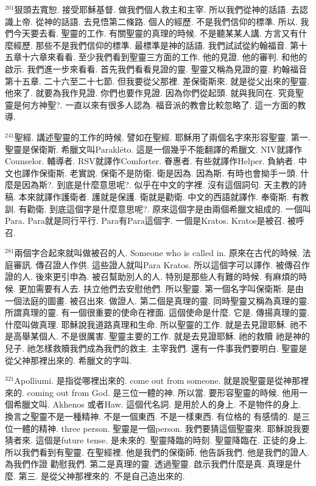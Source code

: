 \documentclass{book}
\begin{document}
$^{201}$狠頭去寬恕.
接受耶穌基督.
做我們個人救主和主宰.
所以我們從神的話語.
去認識上帝.
從神的話語.
去見悟第二條路.
個人的經歷.
不是我們信仰的標準.
所以.
我們今天要去看.
聖靈的工作.
有關聖靈的真理的時候.
不是聽某某人講.
方言又有什麼經歷.
那些不是我們信仰的標準.
最標準是神的話語.
我們試試從約翰福音.
第十五章十六章來看看.
至少我們看到聖靈三方面的工作.
他的見證.
他的審判.
和他的啟示.
我們進一步來看看.
首先我們看看見證的靈.
聖靈又稱為見證的靈.
約翰福音第十五章.
二十六至二十七節.
但我要從父那裡.
差保衛斯來.
就是從父出來的聖靈.
他來了.
就要為我作見證.
你們也要作見證.
因為你們從起頭.
就與我同在.
究竟聖靈是何方神聖?.
一直以來有很多人認為.
福音派的教會比較忽略了.
這一方面的教導.

$^{241}$聖經.
講述聖靈的工作的時候.
譬如在聖經.
耶穌用了兩個名字來形容聖靈.
第一.
聖靈是保衛斯.
希臘文叫Paraklēto.
這是一個幾乎不能翻譯的希臘文.
NIV就譯作Counselor.
輔導者.
RSV就譯作Comforter.
眷惠者.
有些就譯作Helper.
負納者.
中文也譯作保衛斯.
老實說.
保衛不是防衛.
衛是因為.
因為斯.
有時也會拗手一頭.
什麼是因為斯?.
到底是什麼意思呢?.
似乎在中文的字裡.
沒有這個詞句.
天主教的詩稿.
本來就譯作護衛者.
護就是保護.
衛就是勸衛.
中文的西語就譯作.
奉衛斯.
有教訓.
有勸衛.
到底這個字是什麼意思呢?.
原來這個字是由兩個希臘文組成的.
一個叫Para.
Para就是同行平行.
Para有Para這個字.
一個是Kratos.
Kratos是被召.
被呼召.

$^{281}$兩個字合起來就叫做被召的人.
Someone who is called in.
原來在古代的時候.
法庭審訊.
傳召證人作供.
這些證人就叫Para Kratos.
所以這個字可以譯作.
被傳召作證的人.
後來更引申為.
被召幫助別人的人.
特別是那些人有難的時候.
有麻煩的時候.
更加需要有人去.
扶立他們去安慰他們.
所以聖靈.
第一個名字叫保衛斯.
是由一個法庭的圖畫.
被召出來.
做證人.
第二個是真理的靈.
同時聖靈又稱為真理的靈.
所謂真理的靈.
有一個很重要的使命在裡面.
這個使命是什麼.
它是.
傳揚真理的靈.
什麼叫做真理.
耶穌說我道路真理和生命.
所以聖靈的工作.
就是去見證耶穌.
祂不是高舉某個人.
不是很厲害.
聖靈主要的工作.
就是去見證耶穌.
祂的救贖 祂是神的兒子.
祂怎樣救贖我們成為我們的救主.
主宰我們.
還有一件事我們要明白.
聖靈是從父神那裡出來的.
希臘文的字叫.

$^{321}$Apolliumi.
是指從哪裡出來的.
come out from someone.
就是說聖靈是從神那裡來的.
coming out from God.
是三位一體的神.
所以當.
要形容聖靈的時候.
他用一個希臘文叫.
Akhenos 或者Haw.
這個代名詞.
是用於人的身上.
不是物件的身上.
換言之聖靈不是一種精神.
不是一個東西.
不是一樣東西.
有位格的 有感情的.
是三位一體的精神.
three person.
聖靈是一個person.
我們要猜這個聖靈來.
耶穌說我要猜者來.
這個是future tense.
是未來的.
聖靈降臨的時刻.
聖靈降臨在.
正徒的身上.
所以我們看到有聖靈.
在聖經裡.
他是我們的保衛師.
他告訴我們.
他是我們的證人.
為我們作證 勸慰我們.
第二是真理的靈.
透過聖靈.
啟示我們什麼是真.
真理是什麼.
第三.
是從父神那裡來的.
不是自己造出來的.
\end{document}
